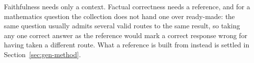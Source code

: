 Faithfulness needs only a context. Factual correctness needs a reference, and for
a mathematics question the collection does not hand one over ready-made: the same
question usually admits several valid routes to the same result, so taking any one
correct answer as the reference would mark a correct response wrong for having
taken a different route. What a reference is built from instead is settled in
Section~\ref{sec:gen-method}.
